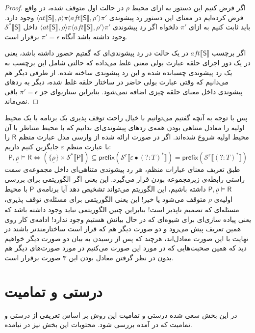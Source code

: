 \begin{proof}
اگر فرض کنیم این دستور به ازای محیط $\rho$ در حالت اول متوقف شده، در واقع فرض کرده‌ایم در معنای این دستور رد پیشوندی 
$\langle at \llbracket \mathsf{S} \rrbracket , \rho \rangle \pi \langle aft \llbracket \mathsf{S} \rrbracket , \rho' \rangle \pi'$ 
وجود دارد.
باید ثابت کنیم به ازای $\pi'$ دلخواه اگر رد پیشوندی
$\langle at \llbracket \mathsf{S} \rrbracket , \rho \rangle \pi \langle aft \llbracket \mathsf{S} \rrbracket , \rho' \rangle \pi'$ 
داخل 
$\mathcal{S^*}\llbracket \mathsf{S} \rrbracket$
وجود داشته باشد آنگاه
$\pi'=\epsilon$
برقرار است.

اگر برچسب
$aft \llbracket \mathsf{S} \rrbracket$
در یک حالت در رد پیشوندی‌ای که گفتیم حضور داشته باشد، یعنی در یک دور اجرای حلقه عبارت بولی معنی غلط می‌داده که حالتی شامل این برچسب به یک رد پیشوندی چسبانده شده و این رد پیشوندی ساخته شده. از طرفی دیگر هم می‌دانیم که وقتی عبارت بولی حاضر در ساختار حلقه غلط شده، دیگر به ردهای پیشوندی داخل معنای حلقه چیزی اضافه نمی‌شود. بنابراین سناریو‌ای جز $\pi'=\epsilon$ باقی نمی‌ماند. 
\end{proof}

پس با توجه به آنچه گفتیم می‌توانیم با خیال راحت توقف پذیری یک برنامه با یک محیط اولیه را معادل متناهی بودن همه‌ی ردهای پیشوندی‌ای بدانیم که با محیط متناظر با آن محیط اولیه شروع شده‌اند.
اگر در صورت ارائه شده از وارسی مدل عبارت منظم $\mathsf{R}$ را با عبارت منظم $\varepsilon$ جایگزین کنیم داریم:
$$\mathsf{P},\underline{\rho} \models \mathsf{R}
\Leftrightarrow
(\{\underline{\rho}\}\times \mathcal{S}^* \llbracket \mathsf{P}\rrbracket) \subseteq 
\mathsf{prefix} (\mathcal{S}^r \llbracket \varepsilon \bullet (?:\mathit{T})^*\rrbracket)
=\mathsf{prefix} (\mathcal{S}^r \llbracket (?:\mathit{T})^*\rrbracket)$$
طبق تعریف معنای عبارات منظم، هر رد پیشوندی متناهی‌ای داخل مجموعه‌ی سمت راستی رابطه‌ی زیرمجموعه بودن قرار می‌گیرد. این یعنی اگر الگوریتمی برای بررسی 
$\mathsf{P} , \underline{\rho} \models \mathsf{R} $
داشته باشیم، این الگوریتم می‌تواند تشخیص دهد آیا برنامه‌ی $\mathsf{P}$ با محیط اولیه‌ی $\underline{\rho}$ متوقف می‌شود یا خیر! این یعنی الگوریتمی برای مسئله‌ی توقف پذیری، مسئله‌ای که تصمیم ناپذیر است! بنابراین چنین الگوریتمی نباید وجود داشته باشد که یعنی پیاده سازی‌ای برای شیوه‌ای که در حال بیانش هستیم وجود ندارد! ادامه‌ی کار روی همین تعریف پیش می‌رود و دو صورت دیگر هم که قرار است ساختارمندتر باشند در نهایت با این صورت معادل‌اند، هرچند که پس از رسیدن به بیان دو صورت دیگر خواهیم دید که همین صحبت‌هایی که در مورد این صورت می‌کنیم در مورد صورت‌های دیگر هم بدون در نظر گرفتن معادل بودن این ۳ صورت برقرار است.





\section{درستی و تمامیت}
در این بخش سعی شده درستی و تمامیت این روش بر اساس تعریفی از درستی و تمامیت که در \cite{statica} آمده بررسی شود. محتویات این بخش نیز در \cite{calcul} نیامده.




